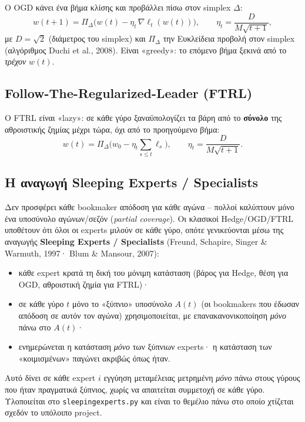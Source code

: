 \documentclass[11pt,a4paper]{article}
\newcommand{\file}[1]{\texttt{#1}}
\renewcommand{\_}{\oldunderscore\allowbreak}
\begin{document}
Ο OGD κάνει ένα βήμα κλίσης και προβάλλει πίσω στον simplex $\Delta$:
\begin{equation}
  w(t+1) = \Pi_{\Delta}\big(w(t) - \eta_t\, \nabla \ell_t(w(t))\big), \qquad
  \eta_t = \frac{D}{M\sqrt{t+1}},
\end{equation}
με $D=\sqrt{2}$ (διάμετρος του simplex) και $\Pi_\Delta$ την Ευκλείδεια προβολή στον simplex
(αλγόριθμος Duchi et al., 2008). Είναι «greedy»: το επόμενο βήμα ξεκινά από το \emph{τρέχον}
$w(t)$.

\subsection{Follow-The-Regularized-Leader (FTRL)}

Ο FTRL είναι «lazy»: σε κάθε γύρο ξαναϋπολογίζει τα βάρη από το \textbf{σύνολο} της
αθροιστικής ζημίας μέχρι τώρα, όχι από το προηγούμενο βήμα:
\begin{equation}
  w(t) = \Pi_{\Delta}\Big(w_0 - \eta_t \sum_{s\le t} \ell_s\Big), \qquad
  \eta_t = \frac{D}{M\sqrt{t+1}}.
\end{equation}

\subsection{Η αναγωγή Sleeping Experts / Specialists}
\label{sec:sleeping}

Δεν προσφέρει κάθε bookmaker απόδοση για κάθε αγώνα -- πολλοί καλύπτουν μόνο ένα υποσύνολο
αγώνων/σεζόν (\emph{partial coverage}). Οι κλασικοί Hedge/OGD/FTRL υποθέτουν ότι όλοι οι
experts μιλούν σε κάθε γύρο, οπότε γενικεύονται μέσω της αναγωγής \textbf{Sleeping
Experts / Specialists} (Freund, Schapire, Singer \& Warmuth, 1997· Blum \& Mansour, 2007):
\begin{itemize}
  \item κάθε expert κρατά τη δική του μόνιμη κατάσταση (βάρος για Hedge, θέση για OGD,
        αθροιστική ζημία για FTRL)·
  \item σε κάθε γύρο $t$ μόνο το «ξύπνιο» υποσύνολο $A(t)$ (οι bookmakers που έδωσαν
        απόδοση σε αυτόν τον αγώνα) χρησιμοποιείται, με επανακανονικοποίηση \emph{μόνο}
        πάνω στο $A(t)$·
  \item ενημερώνεται η κατάσταση \emph{μόνο} των ξύπνιων experts· η κατάσταση των
        «κοιμισμένων» παγώνει ακριβώς όπως ήταν.
\end{itemize}
Αυτό δίνει σε κάθε expert $i$ εγγύηση μεταμέλειας μετρημένη \emph{μόνο} πάνω στους γύρους
που ήταν πραγματικά ξύπνιος, χωρίς να απαιτείται συμμετοχή σε κάθε γύρο. Υλοποιείται στο
\file{sleeping\_experts.py} και είναι το θεμέλιο πάνω στο οποίο χτίζεται σχεδόν το
υπόλοιπο project.
\end{document}
